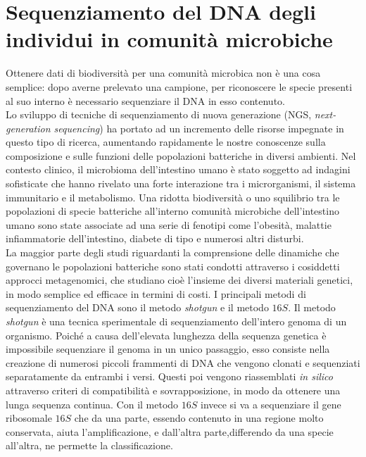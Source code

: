 \section{Sequenziamento del DNA degli individui in comunità microbiche}
Ottenere dati di biodiversità per una comunità microbica non è una cosa semplice: dopo averne prelevato una campione, per riconoscere le specie presenti al suo interno è necessario sequenziare il DNA in esso contenuto.\\
Lo sviluppo di tecniche di sequenziamento di nuova generazione (NGS, \emph{next-generation sequencing}) ha portato ad un incremento delle risorse impegnate in questo tipo di ricerca, aumentando rapidamente le nostre conoscenze sulla composizione e sulle funzioni delle popolazioni batteriche in diversi ambienti\cite{shotgun}. Nel contesto clinico, il microbioma dell'intestino umano è stato soggetto ad indagini sofisticate che hanno rivelato una forte interazione tra i microrganismi, il sistema immunitario e il metabolismo. Una ridotta biodiversità o uno squilibrio tra le popolazioni di specie batteriche all'interno comunità microbiche dell'intestino umano sono state associate ad una serie di fenotipi come l'obesità, malattie infiammatorie dell'intestino, diabete di tipo  e numerosi altri disturbi.\\
La maggior parte degli studi riguardanti la comprensione delle dinamiche che governano le popolazioni batteriche sono stati condotti attraverso i cosiddetti approcci metagenomici, che studiano cioè l'insieme dei diversi materiali genetici, in modo semplice ed efficace in termini di costi. I principali metodi di sequenziamento del DNA sono il metodo \emph{shotgun} e il metodo $16S$.
Il metodo \emph{shotgun} è una tecnica sperimentale di sequenziamento dell'intero genoma di un organismo\cite{HEATHER20161}. Poiché a causa dell'elevata lunghezza della sequenza genetica è impossibile sequenziare il genoma in un unico passaggio, esso consiste nella creazione di numerosi piccoli frammenti di DNA che vengono clonati e sequenziati separatamente da entrambi i versi. Questi poi vengono riassemblati \emph{in silico} attraverso criteri di compatibilità e sovrapposizione, in modo da ottenere una lunga sequenza continua. Con il metodo $16S$ invece si va a sequenziare il gene ribosomale $16S$ che da una parte, essendo contenuto in una regione molto conservata, aiuta l'amplificazione, e dall'altra parte,differendo da una specie all'altra, ne permette la classificazione.\\
